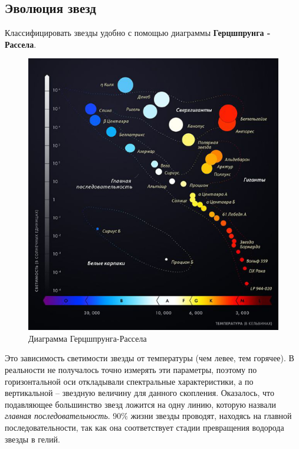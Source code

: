 \subsection{Эволюция звезд}

Классифицировать звезды удобно с помощью диаграммы \textbf{Герцшпрунга - Рассела}. 
\begin{figure}
  \centering
    \includegraphics[width=0.65\linewidth]{Pictures/9_diag.png}
  \caption{Диаграмма Герцшпрунга-Рассела}
  \label{fig:9_diag}
\end{figure}Это зависимость светимости звезды от температуры (чем левее, тем горячее). В реальности не получалось точно измерять эти параметры,  поэтому по горизонтальной оси откладывали спектральные характеристики, а по вертикальной -- звездную величину для данного скопления. Оказалось, что подавляющее большинство звезд ложится на одну линию, которую назвали \textit{главная последовательность}. 90$\%$ жизни звезды проводят, находясь на главной последовательности, так как она соответствует стадии превращения водорода звезды в гелий.

\newpage

